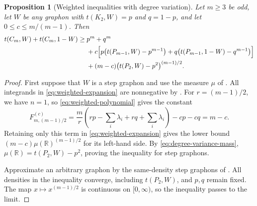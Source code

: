 \documentclass[11pt]{article}
\newtheorem{proposition}[theorem]{Proposition}
\numberwithin{equation}{section}
\newcommand{\R}{\mathbb R}
\newcommand{\tC}[2]{t(C_{#1},#2)}
\newcommand{\tP}[2]{t(P_{#1},#2)}
\newcommand{\edens}[1]{t(K_{2},#1)}
\begin{document}
\begin{proposition}[Weighted inequalities with degree variation]
\label{prop:weighted-variance}
  Let $m\ge3$ be odd, let $W$ be any graphon with $\edens W=p$
  and $q=1-p$, and let $0\le c\le m/(m-1)$. Then
  \begin{equation}\label{eq:weighted-variance-general}
    \begin{aligned}
      \tC mW+\tC m{1-W}\ge{}&p^m+q^m\\
      &+c\Bigl[p\bigl(\tP{m-1}W-p^{m-1}\bigr)
         +q\bigl(\tP{m-1}{1-W}-q^{m-1}\bigr)\Bigr]\\
      &+(m-c)\bigl(\tP2W-p^2\bigr)^{(m-1)/2}.
    \end{aligned}
  \end{equation}
\end{proposition}

\begin{proof}
  First suppose that $W$ is a step graphon and use the measure
  $\mu$ of . All integrands in
  \eqref{eq:weighted-expansion} are nonnegative by
  . For $r=(m-1)/2$, we have $n=1$,
  so \eqref{eq:weighted-polynomial} gives the constant
  \[
    F^{(c)}_{m,(m-1)/2}
      =\frac mr\left(rp-\sum_i\lambda_i
                       +rq+\sum_i\lambda_i\right)-cp-cq
      =m-c.
  \]
  Retaining only this term in \eqref{eq:weighted-expansion} gives
  the lower bound $(m-c)\mu(\R)^{(m-1)/2}$ for its left-hand side.
  By \eqref{eq:degree-variance-mass},
  $\mu(\R)=\tP2W-p^2$, proving the inequality for step graphons.

  Approximate an arbitrary graphon by the same-density step
  graphons of . All densities in the
  inequality converge, including $\tP2W$, and $p,q$ remain fixed.
  The map $x\mapsto x^{(m-1)/2}$ is continuous on $[0,\infty)$,
  so the inequality passes to the limit.
\end{proof}
\end{document}
